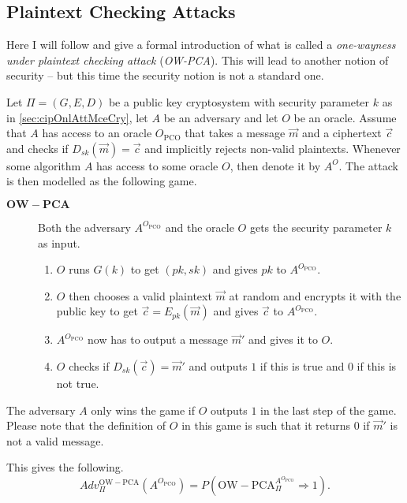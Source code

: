 \subsection{Plaintext Checking Attacks}
\label{subsec:plaCheAtt}

Here I will follow \cite{HHK} and give a formal introduction of what is called a \emph{one-wayness under plaintext checking attack} (\emph{OW-PCA}). This will lead to another notion of security -- but this time the security notion is not a standard one.

Let $\Pi = \left(G,E,D\right)$ be a public key cryptosystem with security parameter $k$ as in \cref{sec:cipOnlAttMceCry}, let $A$ be an adversary and let $O$ be an oracle. Assume that $A$ has access to an oracle $O_{\mathrm{PCO}}$ that takes a message $\vec{m}$ and a ciphertext $\vec{c}$ and checks if $D_{sk}\left(\vec{m}\right) = \vec{c}$ and implicitly rejects non-valid plaintexts. Whenever some algorithm $A$ has access to some oracle $O$, then denote it by $A^{O}$. The attack is then modelled as the following game.
\begin{description}
	\item[$\mathrm{\mathbf{OW-PCA}}$] Both the adversary $A^{O_{\mathrm{PCO}}}$ and the oracle $O$ gets the security parameter $k$ as input.
	\begin{enumerate}
		\item $O$ runs $G\left(k\right)$ to get $\left(pk,sk\right)$ and gives $pk$ to $A^{O_{\mathrm{PCO}}}$.
		\item $O$ then chooses a valid plaintext $\vec{m}$ at random and encrypts it with the public key to get $\vec{c} = E_{pk}\left(\vec{m}\right)$ and gives $\vec{c}$ to $A^{O_{\mathrm{PCO}}}$.
		\item $A^{O_{\mathrm{PCO}}}$ now has to output a message $\vec{m}'$ and gives it to $O$.
		\item $O$ checks if $D_{sk}\left(\vec{c}\right) = \vec{m}'$ and outputs $1$ if this is true and $0$ if this is not true.
	\end{enumerate}
\end{description}
The adversary $A$ only wins the game if $O$ outputs $1$ in the last step of the game. Please note that the definition of $O$ in this game is such that it returns $0$ if $\vec{m}'$ is not a valid message.

This gives the following.
\[
	Adv_{\Pi}^{\mathrm{OW-PCA}}\left( A^{O_{\mathrm{PCO}}} \right) = P\left( \mathrm{OW-PCA}^{A^{O_{\mathrm{PCO}}}}_{\Pi} \Rightarrow 1 \right) .
\]

